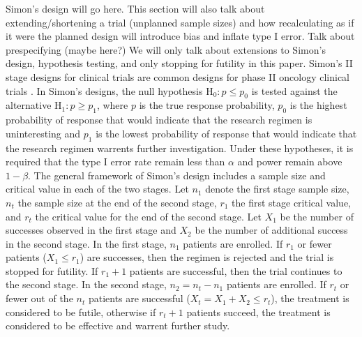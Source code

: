 \documentclass[12pt]{report}\usepackage[]{graphicx}\usepackage[]{color}
\newlength{\li}\setlength{\li}{14.48pt}
\newlength{\di}\setlength{\di}{-3.5mm}
\begin{document}
Simon's design will go here. This section will also talk about extending/shortening a trial (unplanned sample sizes) and how recalculating as if it were the planned design will introduce bias and inflate type I error. Talk about prespecifying (maybe here?)
\newline
We will only talk about extensions to Simon's design, hypothesis testing, and only stopping for futility in this paper.  
\newline
\textbf{}
\newline
\indent Simon's II stage designs for clinical trials are common designs for phase II oncology clinical trials \cite{Simon}. In Simon's designs, the null hypothesis $\mbox{H}_0: p \leq p_0$ is tested against the alternative $\mbox{H}_1: p \geq p_1$, where $p$ is the true response probability, $p_0$ is the highest probability of response that would indicate that the research regimen is uninteresting and $p_1$ is the lowest probability of response that would indicate that the research regimen warrents further investigation. Under these hypotheses, it is required that the type I error rate remain less than $\alpha$ and power remain above $1-\beta$. The general framework of Simon's design includes a sample size and critical value in each of the two stages. Let $n_1$ denote the first stage sample size, $n_t$ the sample size at the end of the second stage, $r_1$ the first stage critical value, and $r_t$ the critical value for the end of the second stage. Let $X_1$ be the number of successes observed in the first stage and $X_2$ be the number of additional success in the second stage. In the first stage, $n_1$ patients are enrolled. If $r_1$ or fewer patients ($X_1 \leq r_1$) are successes, then the regimen is rejected and the trial is stopped for futility. If $r_1 + 1$ patients are successful, then the trial continues to the second stage. In the second stage, $n_2 = n_t - n_1$ patients are enrolled. If $r_t$ or fewer out of the $n_t$ patients are successful ($X_t = X_1 + X_2 \leq r_t$), the treatment is considered to be futile, otherwise if $r_t + 1$ patients succeed, the treatment is considered to be effective and warrent further study.  \\
\end{document}
